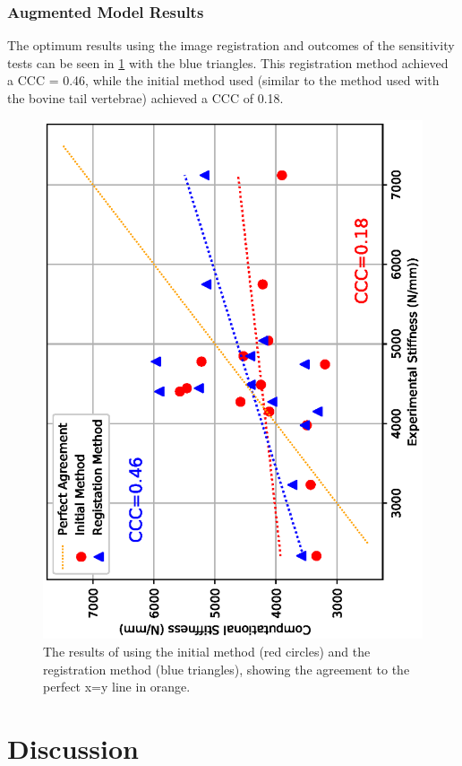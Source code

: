 \subsubsection{Augmented Model Results}

The optimum results using the image registration and outcomes of the sensitivity tests can be seen in \cref{fig:aug_init_vs_best} with the blue triangles.
This registration method achieved a CCC = 0.46, while the initial method used (similar to the method used with the bovine tail vertebrae) achieved a CCC of 0.18.

\begin{figure}[h!]
  \centering
	\includegraphics[width=.65\textwidth, angle=270]{Chapters/Chapter_HT_images/aug_init_vs_best}
	\caption{The results of using the initial method (red circles) and the registration method (blue triangles), showing the agreement to the perfect x=y line in orange.}
	\label{fig:aug_init_vs_best}
\end{figure}
















\section{Discussion}





